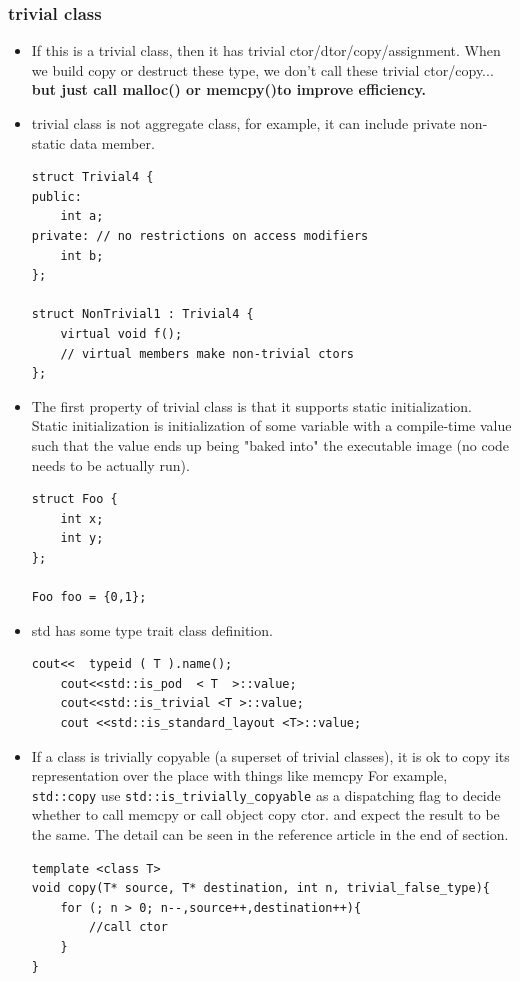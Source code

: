\documentclass[a4paper,11pt,twoside]{book}
\begin{document}
\subsubsection{trivial class}
\begin{itemize}
	\item If this is a trivial class, then it has trivial ctor/dtor/copy/assignment. When we build copy or destruct these type, we don't call these trivial ctor/copy... \textbf{but just call malloc() or memcpy()to improve efficiency.} 
	
	\item trivial class is not aggregate class, for example, it can include private non-static data member. 
\begin{lstlisting}[numbers=none]
struct Trivial4 {
public:
	int a;
private: // no restrictions on access modifiers
	int b;
};
		
struct NonTrivial1 : Trivial4 {
	virtual void f(); 
	// virtual members make non-trivial ctors
};
\end{lstlisting}
	
	
	\item The first property of trivial class is that it supports static initialization. Static initialization is initialization of some variable with a compile-time value such that the value ends up being "baked into" the executable image (no code needs to be actually run).
\begin{lstlisting}[numbers=none]
struct Foo {
	int x;
	int y;
};
	
Foo foo = {0,1};
\end{lstlisting}

\item std has some type trait class definition. 
\begin{lstlisting}[numbers=none]
	cout<<  typeid ( T ).name();
	cout<<std::is_pod  < T  >::value;
	cout<<std::is_trivial <T >::value;
	cout <<std::is_standard_layout <T>::value;
\end{lstlisting}
	
	\item If a class is trivially copyable (a superset of trivial classes), it is ok to copy its representation over the place with things like memcpy For example, \texttt{std::copy} use \texttt{std::is\_trivially\_copyable} as a dispatching flag to decide whether to call memcpy or call object copy ctor. and expect the result to be the same. The detail can be seen in the reference article in the end of section. 
	
\begin{lstlisting}[numbers=none]
template <class T> 
void copy(T* source, T* destination, int n, trivial_false_type){
	for (; n > 0; n--,source++,destination++){
		//call ctor
	}
}
	

\end{lstlisting}
\end{itemize}
\end{document}
